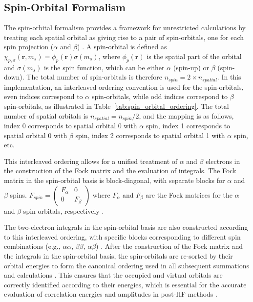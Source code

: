 \subsection{Spin-Orbital Formalism}
\label{subsec:theory_spin_orbitals}

The spin-orbital formalism provides a framework for unrestricted calculations by treating each spatial orbital as giving rise to a pair of spin-orbitals, one for each spin projection ($\alpha$ and $\beta$) \cite{Helgaker2000}. A spin-orbital is defined as $\chi_{p,\sigma}(\mathbf{r}, m_s) = \phi_p(\mathbf{r}) \sigma(m_s)$, where $\phi_p(\mathbf{r})$ is the spatial part of the orbital and $\sigma(m_s)$ is the spin function, which can be either $\alpha$ (spin-up) or $\beta$ (spin-down). The total number of spin-orbitals is therefore $n_{spin} = 2 \times n_{spatial}$. In this implementation, an interleaved ordering convention is used for the spin-orbitals,  even indices correspond to $\alpha$ spin-orbitals, while odd indices correspond to $\beta$ spin-orbitals, as illustrated in Table~\ref{tab:spin_orbital_ordering}. The total number of spatial orbitals is $n_{spatial} = n_{spin} / 2$, and the mapping is as follows, index 0 corresponds to spatial orbital 0 with $\alpha$ spin, index 1 corresponds to spatial orbital 0 with $\beta$ spin, index 2 corresponds to spatial orbital 1 with $\alpha$ spin, etc.

This interleaved ordering allows for a unified treatment of $\alpha$ and $\beta$ electrons in the construction of the Fock matrix and the evaluation of integrals. The Fock matrix in the spin-orbital basis is block-diagonal, with separate blocks for $\alpha$ and $\beta$ spins. $ F_{spin} = \begin{pmatrix}F_\alpha & 0 \\ 0 & F_\beta \end{pmatrix} $ where $F_\alpha$ and $F_\beta$ are the Fock matrices for the $\alpha$ and $\beta$ spin-orbitals, respectively \cite{Helgaker2000}.

The two-electron integrals in the spin-orbital basis are also constructed according to this interleaved ordering, with specific blocks corresponding to different spin combinations (e.g., $\alpha\alpha$, $\beta\beta$, $\alpha\beta$) \cite{Helgaker2000}. After the construction of the Fock matrix and the integrals in the spin-orbital basis, the spin-orbitals are re-sorted by their orbital energies to form the canonical ordering used in all subsequent summations and calculations \cite{Helgaker2000}. This ensures that the occupied and virtual orbitals are correctly identified according to their energies, which is essential for the accurate evaluation of correlation energies and amplitudes in post-HF methods \cite{Jensen2017}.

